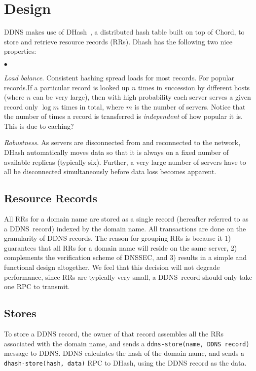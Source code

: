 \section{Design}

DDNS makes use of
DHash~\cite{cfs:sosp01}, a distributed hash table
built on top of Chord, to store
and retrieve resource records (RRs).
Dhash has the following two nice properties:

\begin{list}{$\bullet$}{}
\item {\em Load balance}.
Consistent hashing spread loads for most records.
For popular records.If a particular record is looked up $n$ times
in succession by different hosts (where $n$ can be very large),
then with high probability each server serves a given record 
only $\log{m}$ times in total, 
where $m$ is the number of servers. Notice that
the number of times a record is transferred is 
{\it independent} of how popular it is. This is due to caching?

\item {\em Robustness}.
As servers are disconnected from and reconnected to the network,
DHash automatically moves data so that it is always on a fixed
number of available replicas (typically six).
Further, a very large number of servers have to
all be disconnected simultaneously before data loss
becomes apparent.
\end{list}

\subsection{Resource Records}

All RRs for a domain name are stored 
as a single record (hereafter referred to as a DDNS~record) 
indexed by the domain name.
All transactions are done on the granularity
of DDNS records. The reason for grouping RRs is because it 1)
guarantees that all RRs for a domain name will reside on
the same server, 2) complements the verification scheme
of DNSSEC, and 3) results in a simple
and functional design altogether. We feel that this decision 
will not degrade performance, since RRs are typically 
very small, a DDNS~record should only take one RPC to transmit.

\subsection{Stores}

To store a DDNS record, the owner of that record 
assembles all the RRs associated with the domain name,
and sends a {\tt ddns-store(name, DDNS~record)} message to DDNS. 
DDNS calculates the hash of the domain name, and sends
a {\tt dhash-store(hash, data)} RPC to DHash, using the
DDNS record as the data.


